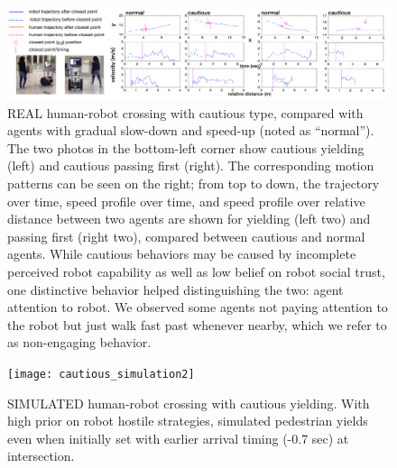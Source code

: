 \documentclass[letterpaper, 10 pt, conference]{ieeeconf}  %
\begin{document}
   \begin{figure}[t]
      \centering
      \hspace{-5em}
      \vspace{-1em}
      \includegraphics[scale=0.5]{cautious_2}
      \hspace{-5em}
      \caption{REAL human-robot crossing with cautious type, compared with 
      agents with gradual slow-down and speed-up (noted as ``normal''). 
      The two photos in the bottom-left corner show cautious yielding (left) 
      and cautious passing first (right). The corresponding motion patterns 
      can be seen on the right; from top to down, the trajectory over time, 
      speed profile over time, and speed profile over relative distance 
      between two agents are shown for yielding (left two) and passing first 
      (right two), compared between cautious and normal agents. While cautious 
      behaviors may be caused by incomplete perceived robot capability as well 
      as low belief on robot social trust, one distinctive behavior helped 
      distinguishing the two: agent attention to robot. We observed some agents 
      not paying attention to the robot but just walk fast past whenever 
      nearby, which we refer to as non-engaging behavior.
      }
      \vspace{-1.5em}
     \label{fig:cautious_recording}
   \end{figure}
   \begin{figure}[t]
      \centering
      \hspace{-5em}
      \vspace{-1em}
      \texttt{[image: cautious\_simulation2]}
      \hspace{-5em}
      \caption{SIMULATED human-robot crossing with cautious yielding. With 
      high prior on robot hostile strategies, simulated pedestrian yields even 
      when initially set with earlier arrival timing (-0.7 sec) at intersection.} 
      \vspace{-0.5em}
     \label{fig:cautious_simulation}
   \end{figure}
\end{document}
